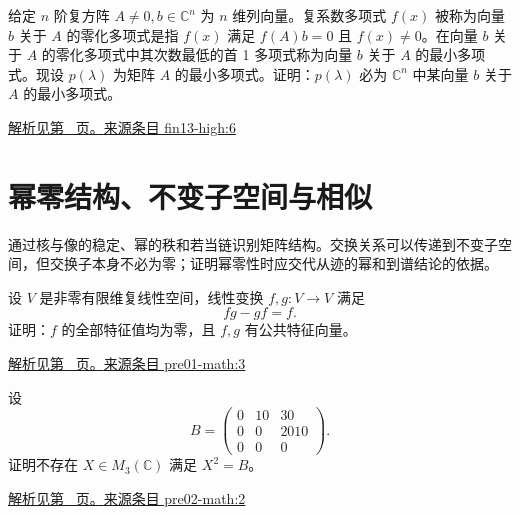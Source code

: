 \documentclass[UTF8,12pt,a4paper,fontset=fandol]{ctexart}
\begin{document}
\begin{example}\label{ex:fin13-high:6}

给定 $n$ 阶复方阵 $A \neq 0, b \in \mathbb{C}^n$ 为 $n$ 维列向量。复系数多项式 $f(x)$ 被称为向量 $b$ 关于 $A$ 的零化多项式是指 $f(x)$ 满足 $f(A)b = 0$ 且 $f(x) \neq 0$。在向量 $b$ 关于 $A$ 的零化多项式中其次数最低的首 1 多项式称为向量 $b$ 关于 $A$ 的最小多项式。现设 $p(\lambda)$ 为矩阵 $A$ 的最小多项式。证明：$p(\lambda)$ 必为 $\mathbb{C}^n$ 中某向量 $b$ 关于 $A$ 的最小多项式。

\par\hyperref[ans:fin13-high:6]{解析见第~\pageref{ans:fin13-high:6} 页。}\quad\href{https://github.com/lzxcr/cmc-mathematics/blob/64916fa1fdbc3e444a652eca204d5669058ee321/src/problems/finals/13/06.md}{来源条目 fin13-high:6}

\end{example}

\section{幂零结构、不变子空间与相似}

\label{sec:questions-6}

通过核与像的稳定、幂的秩和若当链识别矩阵结构。交换关系可以传递到不变子空间，但交换子本身不必为零；证明幂零性时应交代从迹的幂和到谱结论的依据。

\begin{example}\label{ex:pre01-math:3}

设 $V$ 是非零有限维复线性空间，线性变换 $f,g:V\to V$ 满足
\[
fg-gf=f.
\]
证明：$f$ 的全部特征值均为零，且 $f,g$ 有公共特征向量。

\par\hyperref[ans:pre01-math:3]{解析见第~\pageref{ans:pre01-math:3} 页。}\quad\href{https://github.com/lzxcr/cmc-mathematics/blob/64916fa1fdbc3e444a652eca204d5669058ee321/src/problems/preliminary/01/03.md}{来源条目 pre01-math:3}

\end{example}

\begin{example}\label{ex:pre02-math:2}

设
\[
B=\begin{pmatrix}0&10&30\\0&0&2010\\0&0&0\end{pmatrix}.
\]
证明不存在 $X\in M_3(\mathbb C)$ 满足 $X^2=B$。

\par\hyperref[ans:pre02-math:2]{解析见第~\pageref{ans:pre02-math:2} 页。}\quad\href{https://github.com/lzxcr/cmc-mathematics/blob/64916fa1fdbc3e444a652eca204d5669058ee321/src/problems/preliminary/02/02.md}{来源条目 pre02-math:2}

\end{example}
\end{document}

